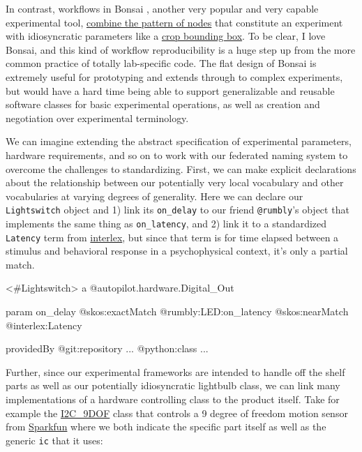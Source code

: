 \documentclass[10pt]{article}
\newenvironment{Shaded}{}{}
\newcommand{\NormalTok}[1]{#1}
\begin{document}
\begin{multicols}{2}
In contrast, workflows in Bonsai \cite{lopesBonsaiEventbasedFramework2015a, lopesNewOpenSourceTools2021} ,
another very popular and very capable experimental tool,
\href{https://github.com/bonsai-rx/bonsai-examples/blob/cbc2c1decc11e1dc1df920421ef88a16fd2e184c/RoiTrigger/RoiTrigger.bonsai}{combine
the pattern of nodes} that constitute an experiment with idiosyncratic
parameters like a
\href{https://github.com/bonsai-rx/bonsai-examples/blob/cbc2c1decc11e1dc1df920421ef88a16fd2e184c/RoiTrigger/RoiTrigger.bonsai\#L76-L85}{crop
bounding box}. To be clear, I love Bonsai, and this kind of workflow
reproducibility is a huge step up from the more common practice of
totally lab-specific code. The flat design of Bonsai is extremely useful
for prototyping and extends through to complex experiments, but would
have a hard time being able to support generalizable and reusable
software classes for basic experimental operations, as well as creation
and negotiation over experimental terminology.

We can imagine extending the abstract specification of experimental
parameters, hardware requirements, and so on to work with our federated
naming system to overcome the challenges to standardizing. First, we can
make explicit declarations about the relationship between our
potentially very local vocabulary and other vocabularies at varying
degrees of generality. Here we can declare our \texttt{Lightswitch}
object and 1) link its \texttt{on\_delay} to our friend
\texttt{@rumbly}'s object that implements the same thing as
\texttt{on\_latency}, and 2) link it to a standardized \texttt{Latency}
term from
\href{https://scicrunch.org/scicrunch/interlex/view/ilx_0106040\#annotations}{interlex},
but since that term is for time elapsed between a stimulus and
behavioral response in a psychophysical context, it's only a partial
match.

\begin{Shaded}
\begin{Highlighting}[]
\NormalTok{\textless{}\#Lightswitch\textgreater{}}
\NormalTok{  a @autopilot.hardware.Digital\_Out}

\NormalTok{  param on\_delay}
\NormalTok{    @skos:exactMatch @rumbly:LED:on\_latency}
\NormalTok{    @skos:nearMatch @interlex:Latency}

\NormalTok{  providedBy}
\NormalTok{    @git:repository ...}
\NormalTok{    @python:class ...}
\end{Highlighting}
\end{Shaded}

Further, since our experimental frameworks are intended to handle off
the shelf parts as well as our potentially idiosyncratic lightbulb
class, we can link many implementations of a hardware controlling class
to the product itself. Take for example the
\href{https://docs.auto-pi-lot.com/en/latest/hardware/i2c.html\#autopilot.hardware.i2c.I2C_9DOF}{I2C\_9DOF}
class that controls a 9 degree of freedom motion sensor from
\href{https://www.sparkfun.com/products/13944}{Sparkfun} where we both
indicate the specific part itself as well as the generic \texttt{ic}
that it uses:


\end{multicols}
\end{document}
